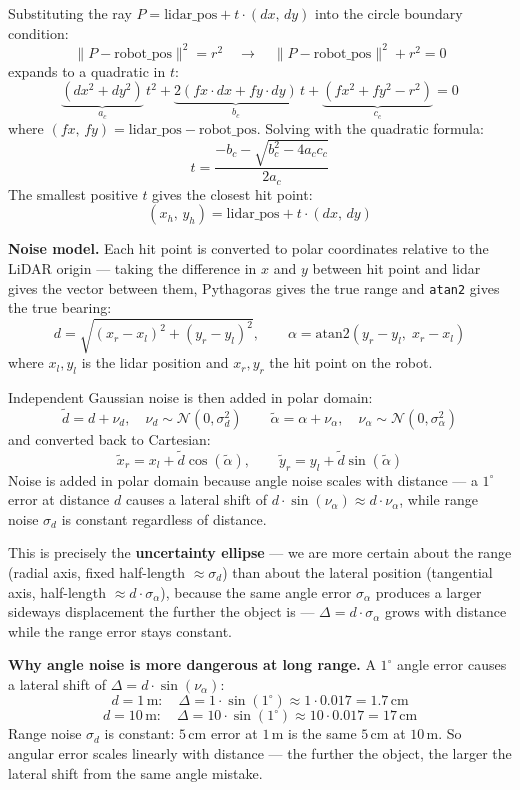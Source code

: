 \documentclass[12pt, a4paper]{article}
\begin{document}
\begin{notebox}
Substituting the ray $P = \text{lidar\_pos} + t\cdot(dx,\,dy)$ into the
circle boundary condition:
\[
  \|P - \text{robot\_pos}\|^2 = r^2 \quad \rightarrow \quad \|P - \text{robot\_pos}\|^2 + r^2 = 0
\]
expands to a quadratic in $t$:
\[
  \underbrace{(dx^2+dy^2)}_{a_c}\,t^2
  + \underbrace{2(fx\cdot dx + fy\cdot dy)}_{b_c}\,t
  + \underbrace{(fx^2+fy^2-r^2)}_{c_c} = 0
\]
where $(fx,\,fy) = \text{lidar\_pos} - \text{robot\_pos}$.
Solving with the quadratic formula:
\[
  t = \frac{-b_c - \sqrt{b_c^2 - 4a_c c_c}}{2a_c}
\]
The smallest positive $t$ gives the closest hit point:
\[
  (x_h,\,y_h) = \text{lidar\_pos} + t\cdot(dx,\,dy)
\]
\end{notebox}
\textbf{Noise model.} Each hit point is converted to polar coordinates
relative to the LiDAR origin --- taking the difference in $x$ and $y$
between hit point and lidar gives the vector between them,
Pythagoras gives the true range and \texttt{atan2} gives the true bearing:
\[
  d = \sqrt{(x_r - x_l)^2 + (y_r - y_l)^2}, \qquad
  \alpha = \text{atan2}(y_r - y_l,\; x_r - x_l)
\]
where $x_l, y_l$ is the lidar position and $x_r, y_r$ the hit point on the robot.

Independent Gaussian noise is then added in polar domain:
\[
  \tilde{d} = d + \nu_d, \quad \nu_d \sim \mathcal{N}(0, \sigma_d^2)
  \qquad
  \tilde{\alpha} = \alpha + \nu_\alpha, \quad \nu_\alpha \sim \mathcal{N}(0, \sigma_\alpha^2)
\]
and converted back to Cartesian:
\[
  \tilde{x}_r = x_l + \tilde{d}\cos(\tilde{\alpha}), \qquad
  \tilde{y}_r = y_l + \tilde{d}\sin(\tilde{\alpha})
\]
Noise is added in polar domain because angle noise scales with distance ---
a $1^\circ$ error at distance $d$ causes a lateral shift of
$d\cdot\sin(\nu_\alpha) \approx d\cdot\nu_\alpha$,
while range noise $\sigma_d$ is constant regardless of distance.

\begin{warnbox}
This is precisely the \textbf{uncertainty ellipse} --- we are more certain
about the range (radial axis, fixed half-length $\approx \sigma_d$) than
about the lateral position (tangential axis, half-length $\approx d\cdot\sigma_\alpha$),
because the same angle error $\sigma_\alpha$ produces a larger sideways
displacement the further the object is --- $\Delta = d\cdot\sigma_\alpha$
grows with distance while the range error stays constant.
\end{warnbox}
\vspace{-0.5cm}
\begin{notebox}
  \textbf{Why angle noise is more dangerous at long range.}
  A $1^\circ$ angle error causes a lateral shift of $\Delta = d\cdot\sin(\nu_\alpha)$:
  \[
    d = 1\,\text{m}:  \quad \Delta = 1 \cdot \sin(1^\circ) \approx 1 \cdot 0.017 = 1.7\,\text{cm}
  \]
  \[
    d = 10\,\text{m}: \quad \Delta = 10 \cdot \sin(1^\circ) \approx 10 \cdot 0.017 = 17\,\text{cm}
  \]
  Range noise $\sigma_d$ is constant: $5\,\text{cm}$ error at $1$\,m is the
  same $5\,\text{cm}$ at $10$\,m. So angular error scales linearly with distance --- the further the object,
  the larger the lateral shift from the same angle mistake.
\end{notebox}
\end{document}
